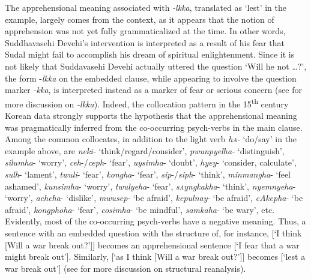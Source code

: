 \documentclass[output=paper,colorlinks,citecolor=brown]{langscibook}
\begin{document}
\largerpage
\noindent The apprehensional meaning associated with \textit{-lkka}, translated as `lest' in the example, largely comes from the context, as it appears that the notion of apprehension was not yet fully grammaticalized at the time. In other words, Suddhavasehi Devehi's intervention is interpreted as a result of his fear that Sudal might fail to accomplish his dream of spiritual enlightenment. Since it is not likely that Suddavasehi Devehi actually uttered the question `Will he not …?', the form  \nobreakdash-\textit{lkka} on the embedded clause, while appearing to involve the question marker \textit{-kka}, is interpreted instead as a marker of fear or serious concern (see  for more discussion on \textit{-lkka}). Indeed, the collocation pattern in the 15\textsuperscript{th} century Korean data strongly supports the hypothesis that the apprehensional meaning was pragmatically inferred from the co-occurring psych-verbs in the main clause. Among the common collocates, in addition to the light verb \textit{h\textsc{a}-} `do/say' in the example above, are \textit{neki-} `think/regard/consider', \textit{pwunpyelha-} `distinguish', \textit{silumha}- `worry', \textit{ceh}-/\textit{ceph}- `fear', \textit{uysimha}- `doubt', \textit{hyey}- `consider, calculate', \textit{sulh}- `lament', \textit{twuli}- `fear', \textit{kongha}- `fear', \textit{sip}-/\textit{siph}- `think', \textit{minmangha}- `feel ashamed', \textit{kunsimha}- `worry', \textit{twulyeha}- `fear', \textit{s\textsc{a}yngkakha}- `think', \textit{nyemnyeha}- `worry', \textit{acheha}- `dislike', \textit{mwusep}- `be afraid', \textit{kepulnay}- `be afraid', \textit{cAkepha}- `be afraid', \textit{kongphoha}- `fear', \textit{cosimha}- `be mindful', \textit{samkaha}- `be wary', etc. Evidently, most of the co-occurring psych-verbs have a negative meaning. Thus, a sentence with an embedded question with the structure of, for instance, [`I think [Will a war break out?']] becomes an apprehensional sentence [`I fear that a war might break out']. Similarly,  [`as I think [Will a war break out?']] becomes [`lest a war break out'] (see  for more discussion on structural reanalysis).
\end{document}
